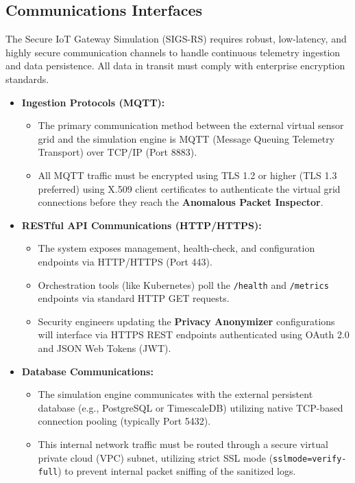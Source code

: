 \documentclass[12pt,letterpaper]{article}
\begin{document}
\subsection{Communications Interfaces}
The Secure IoT Gateway Simulation (SIGS-RS) requires robust, low-latency, and highly secure communication channels to handle continuous telemetry ingestion and data persistence. All data in transit must comply with enterprise encryption standards.

\begin{itemize}
\item \textbf{Ingestion Protocols (MQTT):}
\begin{itemize}
\item The primary communication method between the external virtual sensor grid and the simulation engine is MQTT (Message Queuing Telemetry Transport) over TCP/IP (Port 8883).
\item All MQTT traffic must be encrypted using TLS 1.2 or higher (TLS 1.3 preferred) using X.509 client certificates to authenticate the virtual grid connections before they reach the \textbf{Anomalous Packet Inspector}.
\end{itemize}

\item \textbf{RESTful API Communications (HTTP/HTTPS):}
\begin{itemize}
\item The system exposes management, health-check, and configuration endpoints via HTTP/HTTPS (Port 443).
\item Orchestration tools (like Kubernetes) poll the \texttt{/health} and \texttt{/metrics} endpoints via standard HTTP GET requests.
\item Security engineers updating the \textbf{Privacy Anonymizer} configurations will interface via HTTPS REST endpoints authenticated using OAuth 2.0 and JSON Web Tokens (JWT).
\end{itemize}

\item \textbf{Database Communications:}
\begin{itemize}
\item The simulation engine communicates with the external persistent database (e.g., PostgreSQL or TimescaleDB) utilizing native TCP-based connection pooling (typically Port 5432).
\item This internal network traffic must be routed through a secure virtual private cloud (VPC) subnet, utilizing strict SSL mode (\texttt{sslmode=verify-full}) to prevent internal packet sniffing of the sanitized logs.
\end{itemize}
\end{itemize}
\end{document}

